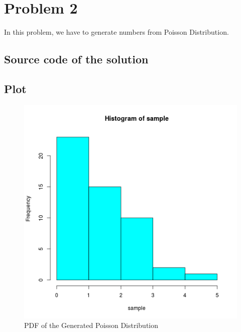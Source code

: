 \documentclass{article}
\begin{document}
	\section{Problem 2}
		In this problem, we have to generate numbers from Poisson Distribution.
		
	\subsection{Source code of the solution}
		
		
	\subsection{Plot}
		
		\begin{figure}[!ht]
  			\includegraphics[width=\linewidth]{pic/que2.png}
 			 \caption{PDF of the Generated Poisson Distribution}
  			\label{fig:hist1}
		\end{figure}
		
\end{document}
